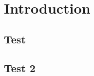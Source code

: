 \documentclass[../main.tex]{subfiles}
\begin{document}
\chapter{Introduction}
\lipsum[1-5]
\section{Test}
\lipsum[1-5]
\section{Test 2}
\lipsum[1-5]
\end{document}
